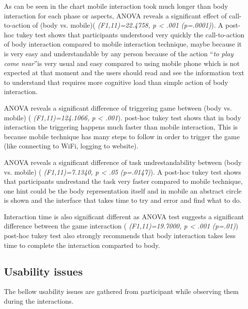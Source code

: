 As can be seen in the chart mobile interaction took much longer than body interaction for each phase or aspects, ANOVA reveals a significant effect of call-to-action of (body vs. mobile)( \emph{(F1,11)=22.4758, p < .001 (p=.0001)}). A post-hoc tukey test shows that participants understood very quickly the call-to-action of body interaction compared to mobile interaction technique, maybe because it is very easy and understandable by any person because of the action ``\emph{to play come near}''is very usual and easy compared to using mobile phone which is not expected at that moment and the users should read and see the information text to understand that requires more cognitive load than simple action of body interaction.

ANOVA reveals a significant difference of triggering game between (body vs. mobile) ( \emph{(F1,11)=124.1066, p < .001}). post-hoc tukey test shows that in body interaction the triggering happens much faster than mobile interaction, This is because mobile technique has many steps to follow in order to trigger the game (like connecting to WiFi, logging to website).


ANOVA reveals a significant difference of task undrestandability between (body vs. mobile) ( \emph{(F1,11)=7.1340, p < .05 (p=.0147)}). A post-hoc tukey test shows that participants undrestand the task very faster compared to mobile technique, one hint could be the body representation itself and in mobile an abstract circle is shown and the interface that takes time to try and error and find what to do.

Interaction time is also significant different as ANOVA test suggests a significant difference between the game interaction ( \emph{(F1,11)=19.7000, p < .001 (p=.01)}) post-hoc tukey test also strongly recommends that body interaction takes less time to complete the interaction comparted to body.

\subsection{Usability issues}
The bellow usability issues are gathered from participant while observing them during the interactions.
